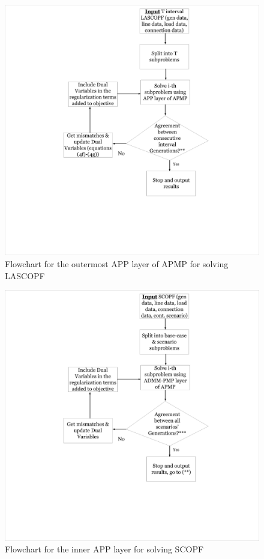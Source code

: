 \documentclass[preprint,12pt,3p]{elsarticle}
\begin{document}
	\begin{figure}
		\begin{center}
			\vspace*{-2cm}
			\hspace*{-4cm}
			\includegraphics[width=0.92\linewidth,trim=5mm 12mm 5mm 5mm, clip]{OutermostAPP.pdf}
			\caption{Flowchart for the outermost APP layer of APMP for solving LASCOPF}
			\label{outermostAPP}
		\end{center}
	\end{figure}
	\begin{figure}
		\begin{center}
			\vspace*{-2cm}
			\hspace*{-4cm}
			\includegraphics[width=0.92\linewidth,trim=5mm 12mm 5mm 5mm, clip]{SCOPFAPP.pdf}
			\caption{Flowchart for the inner APP layer for solving SCOPF}
			\label{SCOPFAPP}
		\end{center}
	\end{figure}
\end{document}
